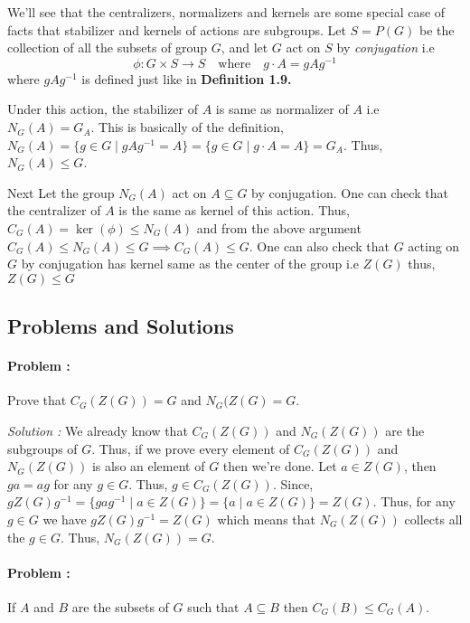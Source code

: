 We'll see that the centralizers, normalizers and kernels are some special case of facts that stabilizer and kernels of actions are subgroups.
Let $S=P(G)$ be the collection of all the subsets of group $G$, and let $G$ act on $S$ by \textit{conjugation} i.e 
\[ \phi : G \times S \to S \quad \text{where} \quad g \cdot A=gAg^{-1} \]
where $gAg^{-1}$ is defined just like in \textbf{Definition 1.9.}

\vspace{4mm}
Under this action, the stabilizer of $A$ is same as normalizer of $A$ i.e $N_G(A)=G_A$.
This is basically of the definition, $N_G(A)=\{g \in G \mid gAg^{-1}=A\} = \{g \in G \mid g \cdot A = A \} = G_A$. Thus, $N_G(A) \le G$.

\vspace{4mm}
Next Let the group $N_G(A)$ act on $A \subseteq G$ by conjugation. One can check that the centralizer of $A$ is the same as 
kernel of this action. Thus, $C_G(A)=\ker(\phi) \le N_G(A)$ and from the above argument $C_G(A) \le N_G(A) \le G \implies C_G(A) \le G$. 
One can also check that $G$ acting on $G$ by conjugation has kernel same as the center of the group i.e $Z(G)$ thus, $Z(G) \le G$

\eject

\subsection*{Problems and Solutions}

\paragraph{Problem :} Prove that $C_G(Z(G))=G$ and $N_G(Z(G)=G$.

\vspace{4mm}
\textit{Solution :} We already know that $C_G(Z(G))$ and $N_G(Z(G))$ are the subgroups of $G$. Thus, if we prove every element of 
$C_G(Z(G))$ and $N_G(Z(G))$ is also an element of $G$ then we're done. Let $a \in Z(G)$, then $g a = a g$ for any $g \in G$. 
Thus, $g \in C_G(Z(G))$. Since, $gZ(G)g^{-1}=\{gag^{-1} \mid a \in Z(G) \} = \{ a \mid a \in Z(G) \} = Z(G)$. Thus, for any $g \in G$
we have $gZ(G)g^{-1}=Z(G)$ which means that $N_G(Z(G))$ collects all the $g \in G$. Thus, $N_G(Z(G))=G$.

\paragraph{Problem :} If $A$ and $B$ are the subsets of $G$ such that $A \subseteq B$ then $C_G(B) \le C_G(A)$.

